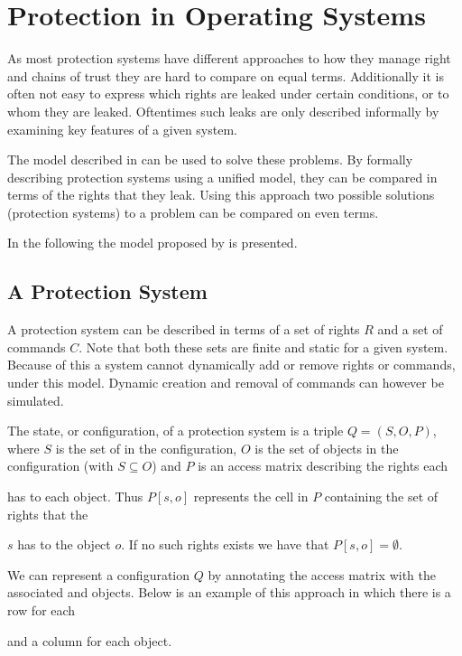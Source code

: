 \section{Protection in Operating Systems}
As most protection systems have different approaches to how they manage right and chains of trust they are hard to compare on equal terms.
Additionally it is often not easy to express which rights are leaked under certain conditions, or to whom they are leaked.
Oftentimes such leaks are only described informally by examining key features of a given system.

The model described in \cite{HRU} can be used to solve these problems.
By formally describing protection systems using a unified model, they can be compared in terms of the rights that they leak.
Using this approach two possible solutions (protection systems) to a problem can be compared on even terms.

In the following the model proposed by \cite{HRU} is presented.

\subsection{A Protection System}
A protection system can be described in terms of a set of rights $R$ and a set of commands $C$.
Note that both these sets are finite and static for a given system.
Because of this a system cannot dynamically add or remove rights or commands, under this model.
Dynamic creation and removal of commands can however be simulated.

\begin{definition}
The state, or configuration, of a protection system is a triple $Q = (S, O, P)$, where $S$ is the set of \subjects{} in the configuration, $O$ is the set of objects in the configuration (with $S \subseteq O$) and $P$ is an access matrix describing the rights each \subject{} has to each object.
Thus $P[s, o]$ represents the cell in $P$ containing the set of rights that the \subject{} $s$ has to the object $o$.
If no such rights exists we have that $P[s,o] = \emptyset$.
\end{definition}

We can represent a configuration $Q$ by annotating the access matrix with the associated \subjects{} and objects.
Below is an example of this approach in which there is a row for each \subject{} and a column for each object.

